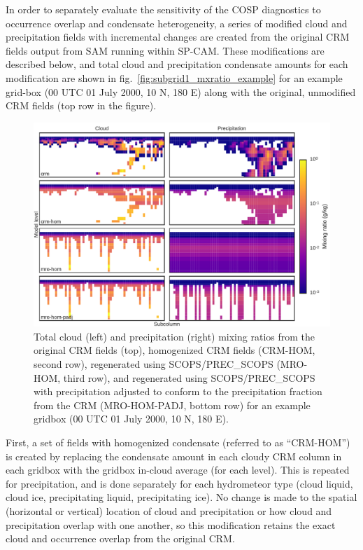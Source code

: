 In order to separately evaluate the sensitivity of the COSP diagnostics
to occurrence overlap and condensate heterogeneity, a series of modified
cloud and precipitation fields with incremental changes are created from
the original CRM fields output from SAM running within SP-CAM. These
modifications are described below, and total cloud and precipitation
condensate amounts for each modification are shown in
fig.~\ref{fig:subgrid1_mxratio_example} for an example grid-box (00 UTC
01 July 2000, 10 N, 180 E) along with the original, unmodified CRM
fields (top row in the figure).

\begin{figure}[htbp]
\centering
\includegraphics{graphics/subgrid1_mxratio_example.pdf}
\caption{\label{fig:subgrid1_mxratio_example}Total cloud (left) and
precipitation (right) mixing ratios from the original CRM fields (top),
homogenized CRM fields (CRM-HOM, second row), regenerated using
SCOPS/PREC\_SCOPS (MRO-HOM, third row), and regenerated using
SCOPS/PREC\_SCOPS with precipitation adjusted to conform to the
precipitation fraction from the CRM (MRO-HOM-PADJ, bottom row) for an
example gridbox (00 UTC 01 July 2000, 10 N, 180
E).}\label{fig:subgrid1ux5fmxratioux5fexample}
\end{figure}

First, a set of fields with homogenized condensate (referred to as
``CRM-HOM'') is created by replacing the condensate amount in each
cloudy CRM column in each gridbox with the gridbox in-cloud average (for
each level). This is repeated for precipitation, and is done separately
for each hydrometeor type (cloud liquid, cloud ice, precipitating
liquid, precipitating ice). No change is made to the spatial (horizontal
or vertical) location of cloud and precipitation or how cloud and
precipitation overlap with one another, so this modification retains the
exact cloud and occurrence overlap from the original CRM.

